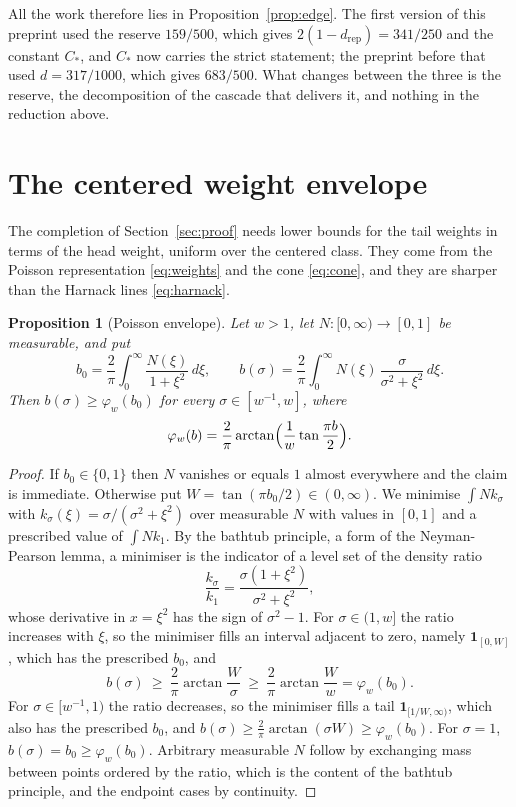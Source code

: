 \documentclass[10pt]{article}
\newtheorem{proposition}[theorem]{Proposition}
\theoremstyle{remark}
\newcommand{\Cstar}{C_{*}}
\newcommand{\drep}{d_{\mathrm{rep}}}
\begin{document}
All the work therefore lies in Proposition~\ref{prop:edge}. The first version of this preprint used the reserve $159/500$, which gives $2(1-\drep)=341/250$ and the constant $\Cstar$, and $\Cstar$ now carries the strict statement; the preprint before that used $d=317/1000$, which gives $683/500$. What changes between the three is the reserve, the decomposition of the cascade that delivers it, and nothing in the reduction above.

\section{The centered weight envelope}\label{sec:weights}

The completion of Section~\ref{sec:proof} needs lower bounds for the tail weights in terms of the head weight, uniform over the centered class. They come from the Poisson representation \eqref{eq:weights} and the cone \eqref{eq:cone}, and they are sharper than the Harnack lines \eqref{eq:harnack}.

\begin{proposition}[Poisson envelope]\label{prop:poisson}
Let $w>1$, let $N:[0,\infty)\to[0,1]$ be measurable, and put
\[
b_0=\frac2\pi\int_0^\infty\frac{N(\xi)}{1+\xi^2}\,d\xi,\qquad
b(\sigma)=\frac2\pi\int_0^\infty N(\xi)\,\frac{\sigma}{\sigma^2+\xi^2}\,d\xi .
\]
Then $b(\sigma)\ge\varphi_w(b_0)$ for every $\sigma\in[w^{-1},w]$, where
\begin{equation}\label{eq:phi}
\varphi_w(b)=\frac2\pi\arctan\Bigl(\frac1w\tan\frac{\pi b}2\Bigr).
\end{equation}
\end{proposition}

\begin{proof}
If $b_0\in\{0,1\}$ then $N$ vanishes or equals $1$ almost everywhere and the claim is immediate. Otherwise put $W=\tan(\pi b_0/2)\in(0,\infty)$. We minimise $\int Nk_\sigma$ with $k_\sigma(\xi)=\sigma/(\sigma^2+\xi^2)$ over measurable $N$ with values in $[0,1]$ and a prescribed value of $\int Nk_1$. By the bathtub principle, a form of the Neyman-Pearson lemma, a minimiser is the indicator of a level set of the density ratio
\[
\frac{k_\sigma}{k_1}=\frac{\sigma(1+\xi^2)}{\sigma^2+\xi^2},
\]
whose derivative in $x=\xi^2$ has the sign of $\sigma^2-1$. For $\sigma\in(1,w]$ the ratio increases with $\xi$, so the minimiser fills an interval adjacent to zero, namely $\mathbf 1_{[0,W]}$, which has the prescribed $b_0$, and
\[
b(\sigma)\ \ge\ \frac2\pi\arctan\frac W\sigma\ \ge\ \frac2\pi\arctan\frac Ww=\varphi_w(b_0).
\]
For $\sigma\in[w^{-1},1)$ the ratio decreases, so the minimiser fills a tail $\mathbf 1_{[1/W,\infty)}$, which also has the prescribed $b_0$, and $b(\sigma)\ge\frac2\pi\arctan(\sigma W)\ge\varphi_w(b_0)$. For $\sigma=1$, $b(\sigma)=b_0\ge\varphi_w(b_0)$. Arbitrary measurable $N$ follow by exchanging mass between points ordered by the ratio, which is the content of the bathtub principle, and the endpoint cases by continuity.
\end{proof}
\end{document}
